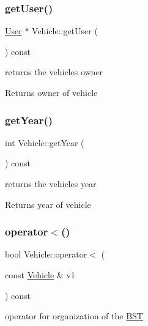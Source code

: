 \subsubsection{\texorpdfstring{get\+User()}{getUser()}}
{\footnotesize\ttfamily \hyperlink{class_user}{User} $\ast$ Vehicle\+::get\+User (\begin{DoxyParamCaption}{ }\end{DoxyParamCaption}) const}



returns the vehicle\textquotesingle{}s owner 

\begin{DoxyReturn}{Returns}
owner of vehicle 
\end{DoxyReturn}
\mbox{\label{group___vehicle_gaa3933383210a75d4c37b66d918ab1526}} 
\subsubsection{\texorpdfstring{get\+Year()}{getYear()}}
{\footnotesize\ttfamily int Vehicle\+::get\+Year (\begin{DoxyParamCaption}{ }\end{DoxyParamCaption}) const}



returns the vehicle\textquotesingle{}s year 

\begin{DoxyReturn}{Returns}
year of vehicle 
\end{DoxyReturn}
\mbox{\label{group___vehicle_ga3e144f33207edd2cdbabcbefea1f3269}} 
\subsubsection{\texorpdfstring{operator$<$()}{operator<()}}
{\footnotesize\ttfamily bool Vehicle\+::operator$<$ (\begin{DoxyParamCaption}\item[{const \hyperlink{class_vehicle}{Vehicle} \&}]{v1 }\end{DoxyParamCaption}) const}



operator for organization of the \hyperlink{class_b_s_t}{B\+ST} 



